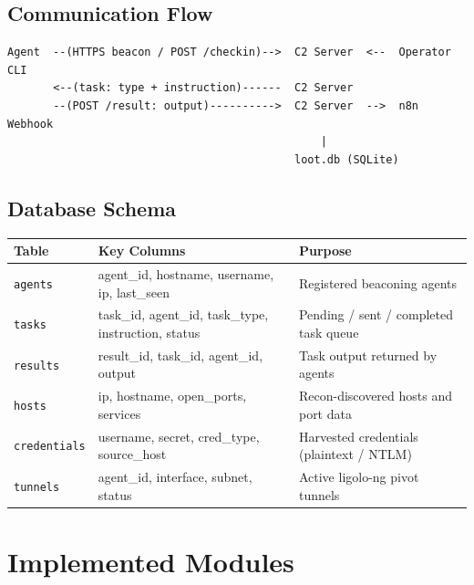 \documentclass[11pt,a4paper]{article}
\newcommand{\theadrow}{\rowcolor{dark}\color{white}\bfseries}
\begin{document}
\subsection{Communication Flow}

\begin{lstlisting}
Agent  --(HTTPS beacon / POST /checkin)-->  C2 Server  <--  Operator CLI
       <--(task: type + instruction)------  C2 Server
       --(POST /result: output)---------->  C2 Server  -->  n8n Webhook
                                                |
                                            loot.db (SQLite)
\end{lstlisting}

\subsection{Database Schema}

\vspace{4pt}
\begin{tabularx}{\linewidth}{L{2.4cm} L{5.4cm} X}
\toprule
\theadrow Table & Key Columns & Purpose \\
\midrule
\texttt{agents}      & agent\_id, hostname, username, ip, last\_seen        & Registered beaconing agents \\
\texttt{tasks}       & task\_id, agent\_id, task\_type, instruction, status  & Pending / sent / completed task queue \\
\texttt{results}     & result\_id, task\_id, agent\_id, output               & Task output returned by agents \\
\texttt{hosts}       & ip, hostname, open\_ports, services                   & Recon-discovered hosts and port data \\
\texttt{credentials} & username, secret, cred\_type, source\_host            & Harvested credentials (plaintext / NTLM) \\
\texttt{tunnels}     & agent\_id, interface, subnet, status                  & Active ligolo-ng pivot tunnels \\
\bottomrule
\end{tabularx}

\section{Implemented Modules}
\end{document}
